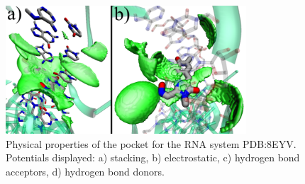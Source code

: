     \begin{figure}[H]
      \centering
      \includegraphics[width=0.8\textwidth]{figures/results/benchmark_rna/8eyv.png}
      \caption{\label{fig:benchmark/8eyv} Physical properties of the pocket for the RNA system PDB:8EYV. Potentials displayed: a) stacking, b) electrostatic, c) hydrogen bond acceptors, d) hydrogen bond donors.}
    \end{figure}


